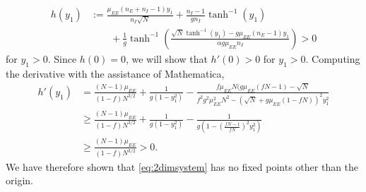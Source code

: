 \documentclass[reqno]{siamonline190516}
\begin{document}
\begin{equation}\label{eq:h}
\begin{aligned}
h(y_1) &:= \frac{\mu_{EE}( n_E + n_I - 1) y_1 }{n_I \sqrt{N}} + \frac{n_I - 1}{g n_I} \tanh^{-1}(y_1) \\
&\qquad+ \frac{1}{g} \tanh^{-1} \left( \frac{ \sqrt{N} \tanh^{-1}(y_1) - g \mu_{EE}(n_E -1) y_1}{ \alpha g \mu_{EE} n_I } \right) > 0
\end{aligned}
\end{equation}
for $y_1 > 0$. Since $h(0) = 0$, we will show that $h'(0) > 0$ for $y_1 > 0$. Computing the derivative with the assistance of Mathematica,
\begin{equation*}\label{eq:hprime}
\begin{aligned}
h'(y_1) &= 
\frac{(N-1)\mu_{EE}}{(1-f) N^{3/2} } + \frac{1}{g(1 - y_1^2)} 
- \frac{
 f \mu_{EE} N ( g \mu_{EE} ( f N - 1) - \sqrt{N}}{f^2 g^2 \mu_{EE}^2 N^2 - (\sqrt{N} + 
 g \mu_{EE}(1 - f N))^2 y_1^2} \\
 &\geq \frac{(N-1)\mu_{EE}}{(1-f) N^{3/2} } + \frac{1}{g(1 - y_1^2)} 
- \frac{1}{g \left( 1 - \left( \frac{ f N - 1}{f N} \right)^2 y_1^2 \right)} \\
&\geq \frac{(N-1)\mu_{EE}}{(1-f) N^{3/2} } > 0.
\end{aligned}
\end{equation*}
We have therefore shown that \cref{eq:2dimsystem} has no fixed points other than the origin.
\end{document}
